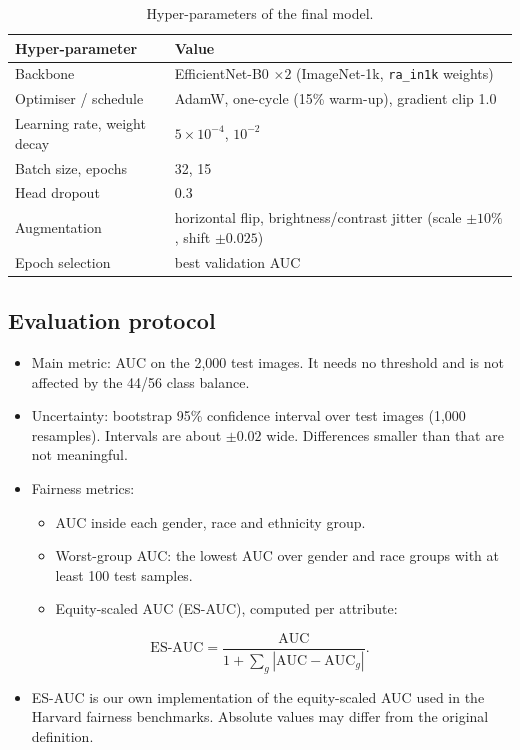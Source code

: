 \documentclass[11pt]{article}
\begin{document}
\begin{table}[t]
\centering\small
\begin{tabular}{lp{8.6cm}}
\toprule
Hyper-parameter & Value \\
\midrule
Backbone & EfficientNet-B0 $\times2$ (ImageNet-1k, \texttt{ra\_in1k} weights) \\
Optimiser / schedule & AdamW, one-cycle (15\% warm-up), gradient clip 1.0 \\
Learning rate, weight decay & $5\times10^{-4}$, $10^{-2}$ \\
Batch size, epochs & 32, 15 \\
Head dropout & 0.3 \\
Augmentation & horizontal flip, brightness/contrast jitter (scale $\pm10\%$, shift $\pm0.025$) \\
Epoch selection & best validation AUC \\
\bottomrule
\end{tabular}
\caption{Hyper-parameters of the final model.}
\label{tab:hp}
\end{table}

\subsection{Evaluation protocol}\label{sec:eval}
\begin{itemize}
\item Main metric: AUC on the 2{,}000 test images. It needs no threshold and is not affected by the 44/56 class balance.
\item Uncertainty: bootstrap 95\% confidence interval over test images (1{,}000 resamples). Intervals are about $\pm0.02$ wide. Differences smaller than that are not meaningful.
\item Fairness metrics:
  \begin{itemize}
  \item AUC inside each gender, race and ethnicity group.
  \item Worst-group AUC: the lowest AUC over gender and race groups with at least 100 test samples.
  \item Equity-scaled AUC (ES-AUC), computed per attribute:
  \end{itemize}
\end{itemize}
\begin{equation}
\text{ES-AUC}=\frac{\text{AUC}}{1+\sum_{g}\left|\text{AUC}-\text{AUC}_g\right|}.
\end{equation}
\begin{itemize}
\item ES-AUC is our own implementation of the equity-scaled AUC used in the Harvard fairness benchmarks. Absolute values may differ from the original definition.
\end{itemize}
\end{document}
